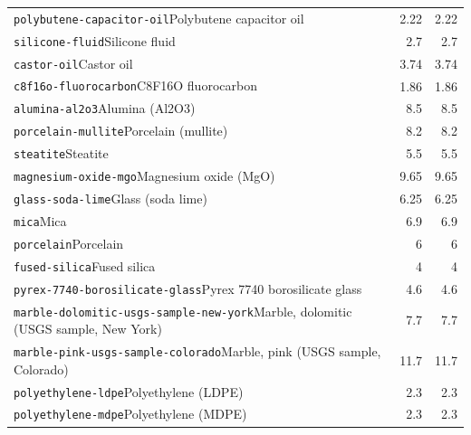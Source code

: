 \begin{longtable}{@{}p{.69\linewidth}rr@{}}
\texttt{polybutene-capacitor-oil}\newline Polybutene capacitor oil & 2.22 & 2.22\\[2pt]
\texttt{silicone-fluid}\newline Silicone fluid & 2.7 & 2.7\\[2pt]
\texttt{castor-oil}\newline Castor oil & 3.74 & 3.74\\[2pt]
\texttt{c8f16o-fluorocarbon}\newline C8F16O fluorocarbon & 1.86 & 1.86\\[2pt]
\texttt{alumina-al2o3}\newline Alumina (Al2O3) & 8.5 & 8.5\\[2pt]
\texttt{porcelain-mullite}\newline Porcelain (mullite) & 8.2 & 8.2\\[2pt]
\texttt{steatite}\newline Steatite & 5.5 & 5.5\\[2pt]
\texttt{magnesium-oxide-mgo}\newline Magnesium oxide (MgO) & 9.65 & 9.65\\[2pt]
\texttt{glass-soda-lime}\newline Glass (soda lime) & 6.25 & 6.25\\[2pt]
\texttt{mica}\newline Mica & 6.9 & 6.9\\[2pt]
\texttt{porcelain}\newline Porcelain & 6 & 6\\[2pt]
\texttt{fused-silica}\newline Fused silica & 4 & 4\\[2pt]
\texttt{pyrex-7740-borosilicate-glass}\newline Pyrex 7740 borosilicate glass & 4.6 & 4.6\\[2pt]
\texttt{marble-dolomitic-usgs-sample-new-york}\newline Marble, dolomitic (USGS sample, New York) & 7.7 & 7.7\\[2pt]
\texttt{marble-pink-usgs-sample-colorado}\newline Marble, pink (USGS sample, Colorado) & 11.7 & 11.7\\[2pt]
\texttt{polyethylene-ldpe}\newline Polyethylene (LDPE) & 2.3 & 2.3\\[2pt]
\texttt{polyethylene-mdpe}\newline Polyethylene (MDPE) & 2.3 & 2.3\\[2pt]

\end{longtable}
